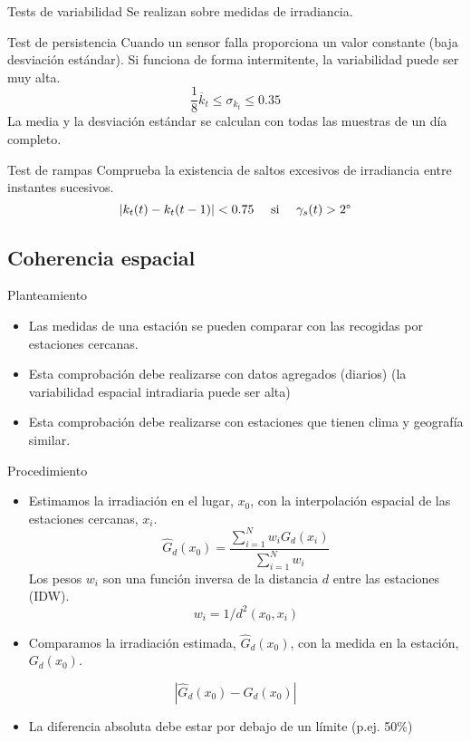 \documentclass[aspectratio=169, usenames,svgnames,dvipsnames]{beamer}
\begin{document}
\begin{frame}[label={sec:orgcfdd46d}]{Tests de variabilidad}
Se realizan sobre medidas de irradiancia.

\begin{block}{Test de persistencia}
Cuando un sensor falla proporciona un valor constante (baja desviación estándar). Si funciona de forma intermitente, la variabilidad puede ser muy alta.
\[
\frac{1}{8} \overline{k}_t \leq \sigma_{k_t} \leq 0.35
\]
La media y la desviación estándar se calculan con todas las muestras de un día completo.
\end{block}

\begin{block}{Test de rampas}
Comprueba la existencia de saltos excesivos de irradiancia entre instantes sucesivos.
\[
\left| k_t(t) - k_t(t-1)\right| < 0.75 \quad \text{ si } \quad \gamma_s(t) > 2\degree
\]
\end{block}
\end{frame}

\subsection{Coherencia espacial}
\label{sec:org75d02b8}
\begin{frame}[label={sec:org0c0f1c8}]{Planteamiento}
\begin{itemize}
\item Las medidas de una estación se pueden comparar con las recogidas por estaciones cercanas.
\item Esta comprobación debe realizarse con \alert{datos agregados} (diarios) (la variabilidad espacial intradiaria puede ser alta)
\item Esta comprobación debe realizarse con estaciones que tienen \alert{clima y geografía similar}.
\end{itemize}

\nocite{Journee.Bertrand2011}
\end{frame}

\begin{frame}[label={sec:orgc84f90c}]{Procedimiento}
\begin{itemize}
\item Estimamos la irradiación en el lugar, \(x_0\), con la interpolación espacial de las estaciones cercanas, \(x_i\).
\[
\widehat{G}_d(x_0) = \frac{\sum_{i=1}^N w_i G_{d}(x_i)}{\sum_{i=1}^N w_i} 
\]
Los pesos \(w_i\) son una función inversa de la distancia \(d\) entre las estaciones (IDW).
\[
  w_i = 1/d^2(x_0, x_i)
\]

\item Comparamos la irradiación estimada, \(\widehat{G}_d(x_0)\), con la medida en la estación, \(G_d(x_0)\).
\end{itemize}
\[
\left| \widehat{G}_d(x_0) - G_d(x_0) \right|
\]
\begin{itemize}
\item La diferencia absoluta debe estar por debajo de un límite (p.ej. 50\%)
\end{itemize}
\end{frame}
\end{document}
